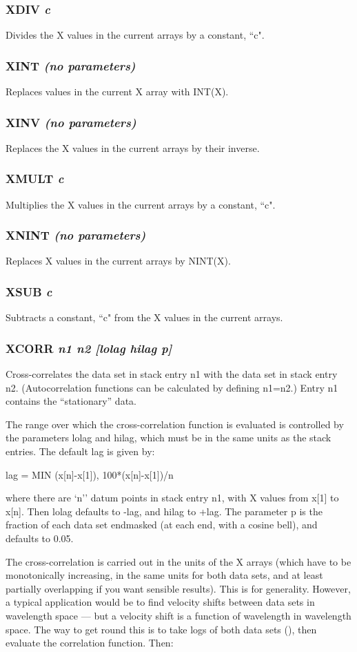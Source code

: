 \documentclass[twoside,11pt,noabs,nolof]{starlink}
\providecommand{\dipcom}[3]{\subsubsection*{\label{COM:#1}\textbf{#1} \emph{#2}}}
\begin{document}
\dipcom{XDIV}{c}{Divides the X values in the current arrays by a constant}
Divides the X values in the current arrays by a constant, ``c".

\dipcom{XINT}{(no parameters)}{Replaces X values in the current arrays by INT(X)}
Replaces values in the current X array with INT(X).

\dipcom{XINV}{(no parameters)}{Replaces X values in the current arrays by 1/X}
Replaces the X values in the current arrays by their inverse.

\dipcom{XMULT}{c}{Multiplies the X values in the current arrays by a constant}
Multiplies the X values in the current arrays by a constant, ``c".

\dipcom{XNINT}{(no parameters)}{Replaces X values in the current arrays by the nearest integers}
Replaces X values in the current arrays by NINT(X).

\dipcom{XSUB}{c}{Subtracts a constant from the X values in the current arrays}
Subtracts a constant, ``c" from the X values in the current arrays.

\dipcom{XCORR}{n1 n2 [lolag hilag p]}{Cross-correlates stack entries}
Cross-correlates the data set in stack entry n1 with the data set in
stack entry n2. (Autocorrelation functions can be calculated by
defining n1=n2.) Entry n1 contains the ``stationary'' data.

The range over which the cross-correlation function is evaluated is
controlled by the parameters lolag and hilag, which must be in the
same units as the stack entries. The default lag is given by:

\begin{terminalv}
lag = MIN{ (x[n]-x[1]), 100*(x[n]-x[1])/n }
\end{terminalv}

where there are `n'' datum points in stack entry n1, with X values from
x[1] to x[n]. Then lolag defaults to -lag, and hilag to +lag. The
parameter p is the fraction of each data set endmasked (at each end,
with a cosine bell), and defaults to 0.05.

The cross-correlation is carried out in the units of the X arrays
(which have to be monotonically increasing, in the same units for both
data sets, and at least partially overlapping if you want sensible
results). This is for generality. However, a typical application would
be to find velocity shifts between data sets in wavelength space ---
but a velocity shift is a function of wavelength in wavelength space.
The way to get round this is to take logs of both data sets
(),
then evaluate the correlation function. Then:
\end{document}

